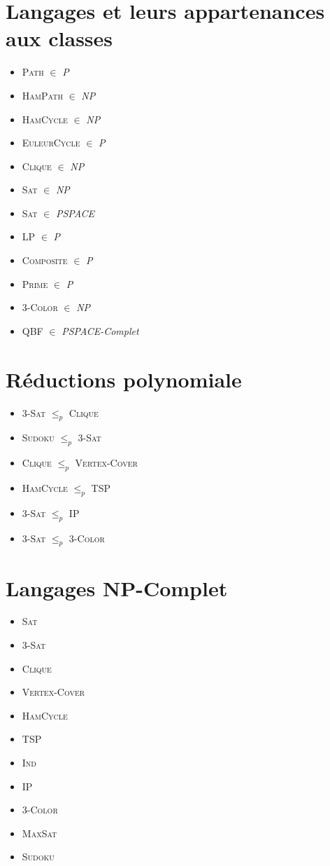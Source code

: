 \documentclass[a4paper,11pt]{report}
\newcommand{\Poly}{\textit{P}}
\newcommand{\NPoly}{\textit{NP}}
\newcommand{\PSpace}{\textit{PSPACE}}
\newcommand{\PSpaceComp}{\textit{PSPACE-Complet}}
\newcommand{\PolyReduc}[2]{\textsc{#1} $\le_{p}$ \textsc{#2}}
\begin{document}
\section{Langages et leurs appartenances aux classes}
\begin{itemize}
\item \textsc{Path} $\in$ \Poly
\item \textsc{HamPath} $\in$ \NPoly
\item \textsc{HamCycle} $\in$ \NPoly
\item \textsc{EuleurCycle} $\in$ \Poly
\item \textsc{Clique} $\in$ \NPoly
\item \textsc{Sat} $\in$ \NPoly
\item \textsc{Sat} $\in$ \PSpace
\item \textsc{LP} $\in$ \Poly
\item \textsc{Composite} $\in$ \Poly
\item \textsc{Prime} $\in$ \Poly
\item \textsc{3-Color} $\in$ \NPoly
\item \textsc{QBF} $\in$ \PSpaceComp
\end{itemize}

\section{Réductions polynomiale}
\begin{itemize}
\item \PolyReduc{3-Sat}{Clique}
\item \PolyReduc{Sudoku}{3-Sat}
\item \PolyReduc{Clique}{Vertex-Cover}
\item \PolyReduc{HamCycle}{TSP}
\item \PolyReduc{3-Sat}{IP}
\item \PolyReduc{3-Sat}{3-Color}
\end{itemize}

\section{Langages NP-Complet}
\begin{itemize}
\item \textsc{Sat}
\item \textsc{3-Sat}
\item \textsc{Clique}
\item \textsc{Vertex-Cover}
\item \textsc{HamCycle}
\item \textsc{TSP}
\item \textsc{Ind}
\item \textsc{IP}
\item \textsc{3-Color}
\item \textsc{MaxSat}
\item \textsc{Sudoku}
\end{itemize}
\end{document}
